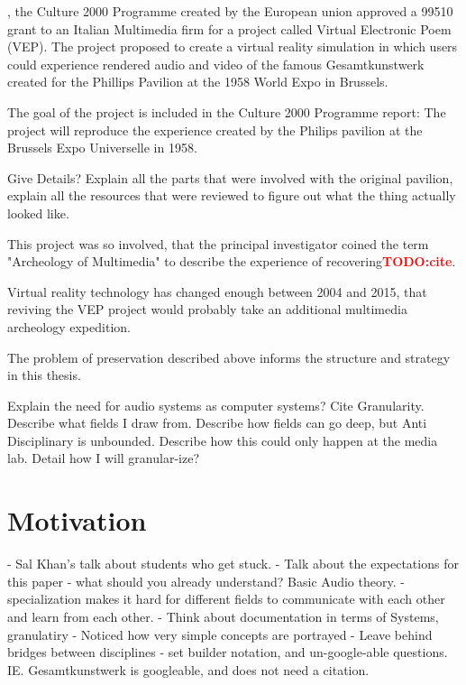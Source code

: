 \documentclass{tufte-book}
\newcommand{\TODO}[1]{\textcolor{red}{\bf TODO:#1}\xspace}
\begin{document}
, the Culture 2000 Programme created by the 
European union approved a 99510\EUR{} grant to an Italian Multimedia 
firm for a project called Virtual Electronic Poem (VEP)\cite{eu2004}. 
The project proposed to create a virtual reality simulation in which 
users could experience rendered audio and video of the famous
Gesamtkunstwerk created for the Phillips Pavilion at the 1958 World
Expo in Brussels. 

The goal of the project is included in the Culture 2000 Programme
report: The project will reproduce the experience created by the
Philips pavilion at the Brussels Expo Universelle in 1958.

Give Details? Explain all the parts that were involved with the
original pavilion, explain all the resources that were reviewed to
figure out what the thing actually looked like.

This project was so involved, that the principal investigator coined
the term "Archeology of Multimedia" to describe the experience of
recovering\TODO{cite}.

Virtual reality technology has changed enough between 2004 and 2015,
that reviving the VEP project would probably take an additional
multimedia archeology expedition.

The problem of preservation described above informs the structure and
strategy in this thesis. 

Explain the need for audio systems as computer systems? Cite
Granularity. Describe what fields I draw from. Describe how fields can
go deep, but Anti Disciplinary is unbounded. Describe how this could
only happen at the media lab. Detail how I will granular-ize?

\section{Motivation}
\label{sec:motivation}

  - Sal Khan's talk about students who get stuck. 
  - Talk about the expectations for this paper - what should you
    already understand? Basic Audio theory. 
  - specialization makes it hard for different fields to communicate
  with each other and learn from each other.
  - Think about documentation in terms of Systems, granulatiry
  - Noticed how very simple concepts are portrayed 
  - Leave behind bridges between disciplines
  - set builder notation, and un-google-able
  questions. IE. Gesamtkunstwerk is googleable, and does not need a
  citation. 
\end{document}
